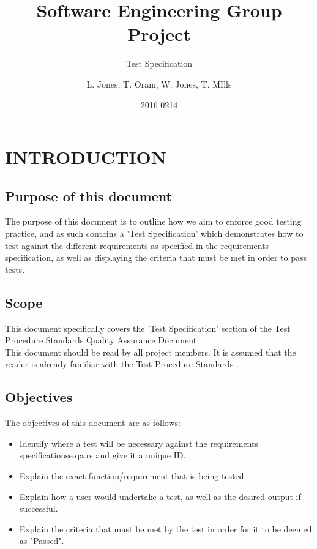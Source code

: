 \documentclass{project}
\begin{document}
\title{Software Engineering Group Project}
\subtitle{Test Specification}
\author{L. Jones, T. Oram, W. Jones, T. MIlls}     
\date{2016-0214}
\maketitle
\tableofcontents
\newpage
\section{INTRODUCTION}
\subsection{Purpose of this document}
The purpose of this document is to outline how we aim to enforce good testing practice, and as such contains a 'Test Specification' which demonstrates how to test against the different requirements as specified in the requirements specification\cite{se.qa.rs}, as well as displaying the criteria that must be met in order to pass tests.
\subsection{Scope}
This document specifically covers the 'Test Specification' section of the Test Procedure Standards Quality Assurance Document\cite{se.qa.tps}\\
\newline
This document should be read by all project members. It is assumed that the reader is already familiar with the Test Procedure Standards \cite{se.qa.tps}.
\subsection{Objectives}
The objectives of this document are as follows:
\begin{itemize}
	\item Identify where a test will be necessary against the requirements specification{se.qa.rs} and give it a unique ID. 
	\item Explain the exact function/requirement that is being tested.
	\item Explain how a user would undertake a test, as well as the desired output if successful.
	\item Explain the criteria that must be met by the test in order for it to be deemed as "Passed".
\end{itemize} 
\clearpage
\end{document}
